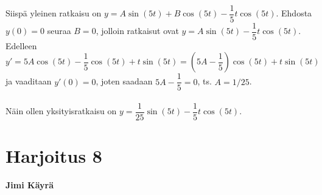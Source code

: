 \documentclass[12pt,fleqn]{article}
\begin{document}
\begin{enumerate}[label=\textbf{\arabic*.}]
 \\
Siispä yleinen ratkaisu on \(y=A\sin (5t)+B\cos (5t)-\dfrac{1}{5}t\cos (5t)\). Ehdosta \(y(0)=0\) seuraa \(B=0\), jolloin ratkaisut ovat \(y=A\sin (5t)-\dfrac{1}{5}t\cos (5t)\). Edelleen \[y'=5A\cos (5t)-\dfrac{1}{5}\cos (5t)+t\sin (5t)=\left (5A-\dfrac{1}{5}\right )\cos (5t)+t\sin (5t)\] ja vaaditaan \(y'(0)=0\), joten saadaan \(5A-\dfrac{1}{5}=0\), ts. \(A=1/25\).\\
 \\
Näin ollen yksityisratkaisu on \(y=\dfrac{1}{25}\sin (5t)-\dfrac{1}{5}t\cos (5t)\).
\end{enumerate}


\newpage
\section*{Harjoitus 8}
\textbf{Jimi Käyrä}
\end{document}
